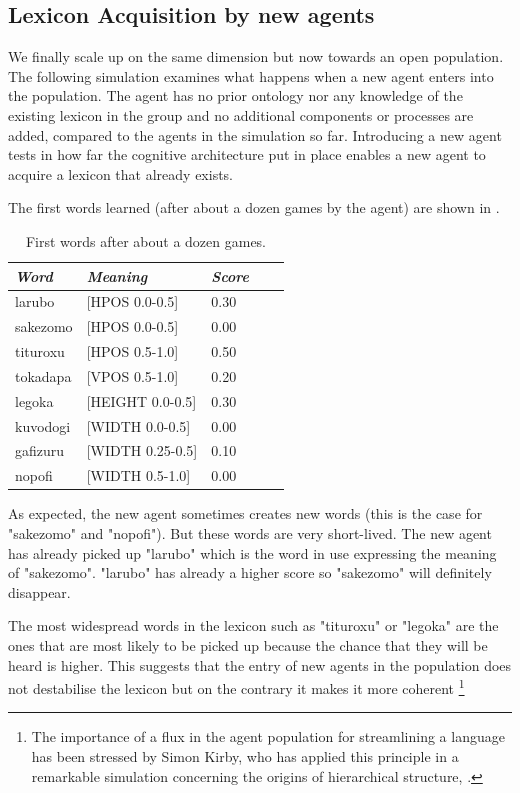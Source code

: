 \subsection{Lexicon Acquisition by new agents}

We finally scale up on the same dimension but 
now towards an open population. The following 
simulation examines what happens when a new agent 
enters into the population. The agent has no 
prior ontology nor any knowledge of the existing
lexicon in the group and no additional components
or processes are added, compared to the agents
in the simulation so far. Introducing a new 
agent tests in how far the cognitive architecture
put in place enables a new agent to acquire a 
lexicon that already exists. 

The first words learned (after about a dozen 
games by the agent) are shown in . 
\begin{table}
\begin{center}
\begin{tabular}{ l  l  l  l  l } \midrule
{\it Word} & {\it Meaning} & {\it Score} \\ \midrule
larubo  & [HPOS 0.0-0.5] & 0.30 \\ \midrule
sakezomo &  [HPOS 0.0-0.5] & 0.00 \\ \midrule
tituroxu &  [HPOS 0.5-1.0] & 0.50 \\ \midrule
tokadapa & [VPOS 0.5-1.0] & 0.20 \\ \midrule
legoka   & [HEIGHT 0.0-0.5] & 0.30 \\ \midrule
kuvodogi  & [WIDTH 0.0-0.5] & 0.00 \\ \midrule
gafizuru &  [WIDTH 0.25-0.5] & 0.10  \\ \midrule
nopofi  & [WIDTH 0.5-1.0] & 0.00 \\ \midrule
\end{tabular}
\caption{\label{tab:first} First words after about a dozen games.}
\end{center}
\end{table}

As expected, the new 
agent sometimes creates new words (this is the case 
for "sakezomo" and "nopofi"). But these words are 
very short-lived. The new agent has already picked up 
"larubo" which is the word in use expressing the 
meaning of "sakezomo". "larubo" has already a higher 
score so "sakezomo" will definitely disappear. 

The most widespread words in the lexicon 
such as "tituroxu" or "legoka" are the ones that 
are most likely to be picked up because the chance
that they will be heard is higher. This suggests
that the entry of new agents in the population does
not destabilise the lexicon but on the contrary 
it makes it more coherent \footnote{The importance of a flux in the agent population for
streamlining a language has been stressed by Simon Kirby, who 
has applied this principle in a remarkable simulation 
concerning the origins of hierarchical structure, \cite{Kirby:1999}.}

